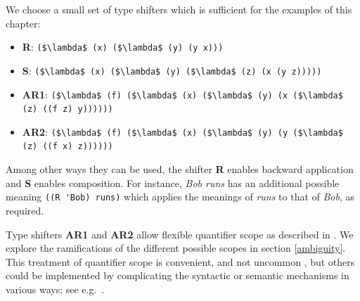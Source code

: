 \documentclass[pdfextras]{handbook}
\begin{document}
We choose a small set of type shifters which is sufficient for the examples of this chapter:
\begin{itemize}
\item \textbf{R}: \lstinline[mathescape]{($\lambda$ (x) ($\lambda$ (y) (y x)))}
\item \textbf{S}: \lstinline[mathescape]{($\lambda$ (x) ($\lambda$ (y) ($\lambda$ (z) (x (y z)))))}
\item \textbf{AR1}: \lstinline[mathescape]{($\lambda$ (f) ($\lambda$ (x) ($\lambda$ (y) (x ($\lambda$ (z) ((f z) y))))))}
\item \textbf{AR2}: \lstinline[mathescape]{($\lambda$ (f) ($\lambda$ (x) ($\lambda$ (y) (y ($\lambda$ (z) ((f x) z))))))}
\end{itemize}
Among other ways they can be used, the shifter \textbf{R} enables backward application and \textbf{S} enables composition.
For instance, \emph{Bob runs} has an additional possible meaning \lstinline[mathescape]{((R 'Bob) runs)} which applies the meanings of \emph{runs} to that of \emph{Bob}, as required.

Type shifters \textbf{AR1} and \textbf{AR2} allow flexible quantifier scope as described in \citet{hendriks93,barker05}. \citep[The specific choice here follows][pp.453ff.]{barker05} 
We explore the ramifications of the different possible scopes in section \ref{ambiguity}.
This treatment of quantifier scope is convenient, and not uncommon \citep{jacobson99,steedman01}, but others could be implemented by complicating the syntactic or semantic mechanisms in various ways: see e.g.~\citet{may77,steedman2012taking}.

\end{document}

